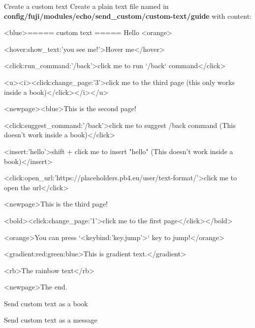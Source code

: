 \begin{example}{Create a custom text}
    Create a plain text file named  in \textbf{config/fuji/modules/echo/send\_custom/custom-text/guide} with content:
    \begin{sh}
        <blue>===== custom text =====
        Hello <orange>%

        <hover:show_text:'you see me!'>Hover me</hover>

        <click:run_command:'/back'>click me to run `/back` command</click>

        <u><i><click:change_page:'3'>click me to the third page (this only works inside a book)</click></i></u>

        <newpage><blue>This is the second page!

        <click:suggest_command:'/back'>click me to suggest /back command (This doesn't work inside a book)</click>

        <insert:'hello'>shift + click me to insert "hello" (This doesn't work inside a book)</insert>

        <click:open_url:'https://placeholders.pb4.eu/user/text-format/'>click me to open the url</click>

        <newpage>This is the third page!

        <bold><click:change_page:'1'>click me to the first page</click></bold>

        <orange>You can press `<keybind:'key.jump'>` key to jump!</orange>

        <gradient:red:green:blue>This is gradient text.</gradient>

        <rb>The rainbow text</rb>

        <newpage>The end.
    \end{sh}
\end{example}

\begin{example}{Send custom text as a book}
\end{example}

\begin{example}{Send custom text as a message}
\end{example}
